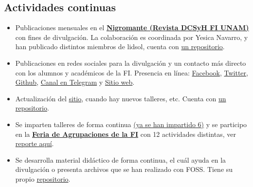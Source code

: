 \documentclass[a4paper,11pt]{article}                 %
\begin{document}
  \subsection{Actividades continuas}
  \begin{itemize}
    \item Publicaciones mensuales en el \href{https://issuu.com/nigromantefi}{\textbf{Nigromante  (Revista DCSyH FI  UNAM)}} con fines de divulgación. La colaboración es coordinada por Yesica Navarro, y han publicado distintos miembros de lidsol, cuenta con \href{https://github.com/LIDSOL/material-didactico/tree/master/nigromante}{un repositorio}. 
    \item  Publicaciones en redes sociales para la divulgación y un contacto más directo con los alumnos y académicos de la FI. Presencia en línea: \href{https://www.facebook.com/lidsol.unam}{Facebook}, \href{https://twitter.com/LIDSOL}{Twitter}, \href{https://github.com/LIDSOL}{Github}, \href{https://t.me/lidsol}{Canal en Telegram} y \href{https://lidsol.org/}{Sitio web}. 
    \item Actualización del \href{https://lidsol.org/}{sitio}, cuando hay nuevos talleres, etc. Cuenta con \href{https://github.com/LIDSOL/sitio-web-lidsol}{un repositorio}. 
    \item Se imparten talleres de forma continua \href{https://lidsol.org/talleres/}{(ya se han impartido 6)} y se participo en la \href{https://lidsol.org/talleres/0005_feria_agrupaciones.html}{\textbf{Feria de Agrupaciones de la FI}} con 12 actividades distintas, ver \href{https://github.com/LIDSOL/administracion-interna/blob/master/eventos/feria-agrupaciones/feria-agrupaciones-2018-2.pdf}{reporte aquí}.
    \item Se desarrolla material didáctico de forma continua, el cuál ayuda en la divulgación o presenta archivos que se han realizado con FOSS. Tiene su propio \href{https://github.com/LIDSOL/material-didactico}{repositorio}.
  \end{itemize}
  
  
  
  
  
  
   
  


\end{document}
